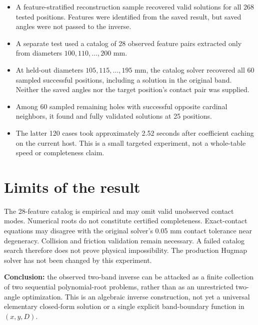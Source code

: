\documentclass{article}
\begin{document}
\begin{itemize}
\item A feature-stratified reconstruction sample recovered valid solutions for all 268 tested positions. Features were identified from the saved result, but saved angles were not passed to the inverse.
\item A separate test used a catalog of 28 observed feature pairs extracted only from diameters $100,110,\ldots,200$ mm.
\item At held-out diameters $105,115,\ldots,195$ mm, the catalog solver recovered all 60 sampled successful positions, including a solution in the original band. Neither the saved angles nor the target position's contact pair was supplied.
\item Among 60 sampled remaining holes with successful opposite cardinal neighbors, it found and fully validated solutions at 25 positions.
\item The latter 120 cases took approximately 2.52 seconds after coefficient caching on the current host. This is a small targeted experiment, not a whole-table speed or completeness claim.
\end{itemize}

\section{Limits of the result}
The 28-feature catalog is empirical and may omit valid unobserved contact modes. Numerical roots do not constitute certified completeness. Exact-contact equations may disagree with the original solver's 0.05 mm contact tolerance near degeneracy. Collision and friction validation remain necessary. A failed catalog search therefore does not prove physical impossibility. The production Hugmap solver has not been changed by this experiment.

\noindent\textbf{Conclusion:} the observed two-band inverse can be attacked as a finite collection of two sequential polynomial-root problems, rather than as an unrestricted two-angle optimization. This is an algebraic inverse construction, not yet a universal elementary closed-form solution or a single explicit band-boundary function in $(x,y,D)$.
\end{document}

